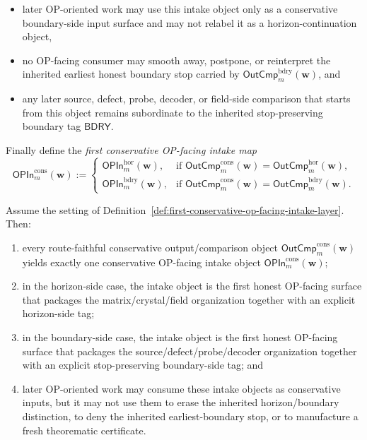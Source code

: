 \begin{definition}
\begin{enumerate}[label=(\roman*)]
\begin{itemize}[leftmargin=2em]
 \item later OP-oriented work may use this intake object only as a conservative boundary-side input surface and may not relabel it as a horizon-continuation object,
 \item no OP-facing consumer may smooth away, postpone, or reinterpret the inherited earliest honest boundary stop carried by \(\mathsf{OutCmp}^{\mathrm{bdry}}_{m}(\mathbf w)\), and
 \item any later source, defect, probe, decoder, or field-side comparison that starts from this object remains subordinate to the inherited stop-preserving boundary tag \(\mathsf{BDRY}\).
 \end{itemize}
\end{enumerate}
Finally define the \emph{first conservative OP-facing intake map}
\[
 \mathsf{OPIn}^{\mathrm{cons}}_{m}(\mathbf w)
 :=
 \begin{cases}
 \mathsf{OPIn}^{\mathrm{hor}}_{m}(\mathbf w), & \text{if }\mathsf{OutCmp}^{\mathrm{cons}}_{m}(\mathbf w)=\mathsf{OutCmp}^{\mathrm{hor}}_{m}(\mathbf w),\\[2mm]
 \mathsf{OPIn}^{\mathrm{bdry}}_{m}(\mathbf w), & \text{if }\mathsf{OutCmp}^{\mathrm{cons}}_{m}(\mathbf w)=\mathsf{OutCmp}^{\mathrm{bdry}}_{m}(\mathbf w).
 \end{cases}
\]
\end{definition}

\begin{proposition}
\label{prop:every-route-faithful-conservative-output-comparison-object-yields-exactly-one-conservative-op-facing-intake-object}
Assume the setting of Definition~\ref{def:first-conservative-op-facing-intake-layer}. Then:
\begin{enumerate}[label=(\roman*)]
 \item every route-faithful conservative output/comparison object \(\mathsf{OutCmp}^{\mathrm{cons}}_{m}(\mathbf w)\) yields exactly one conservative OP-facing intake object \(\mathsf{OPIn}^{\mathrm{cons}}_{m}(\mathbf w)\);
 \item in the horizon-side case, the intake object is the first honest OP-facing surface that packages the matrix/crystal/field organization together with an explicit horizon-side tag;
 \item in the boundary-side case, the intake object is the first honest OP-facing surface that packages the source/defect/probe/decoder organization together with an explicit stop-preserving boundary-side tag; and
 \item later OP-oriented work may consume these intake objects as conservative inputs, but it may not use them to erase the inherited horizon/boundary distinction, to deny the inherited earliest-boundary stop, or to manufacture a fresh theorematic certificate.
\end{enumerate}
\end{proposition}

